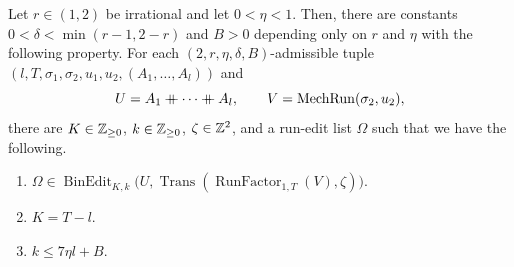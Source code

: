 \begin{lemma}\label{lem:binary-mechanical}
Let $r\in(1,2)$ be irrational and let $0<\eta<1$.
Then, there are constants $0<\delta<\min(r-1,2-r)$ and $B>0$
depending only on $r$ and $\eta$ with the following property.
For each $(2,r,\eta,\delta,B)$-admissible tuple
$(l,T,\sigma_1,\sigma_2,u_1,u_2,(A_1,\ldots,A_l))$ and
\[
 U=A_1\mathbin{+\mkern-10mu+}\cdots\mathbin{+\mkern-10mu+} A_l,\qquad V=\operatorname{MechRun}(\sigma_2,u_2),
\]
there are $K\in\mathbb Z_{\ge0}$, $k\in\mathbb Z_{\ge0}$, $\zeta\in\mathbb Z^2$, and a run-edit list $\Omega$ such that we have the following.
\begin{enumerate}
\item\label{c:binary-mechanical-target} $\Omega\in\operatorname{BinEdit}_{K,k}
 \bigl(U,\operatorname{Trans}(\operatorname{RunFactor}_{1,T}(V),\zeta)\bigr)$.
\item\label{c:binary-mechanical-insertions} $K=T-l$.
\item\label{c:binary-mechanical-exchanges} $k\le7\eta l+B$.
\end{enumerate}
\end{lemma}
